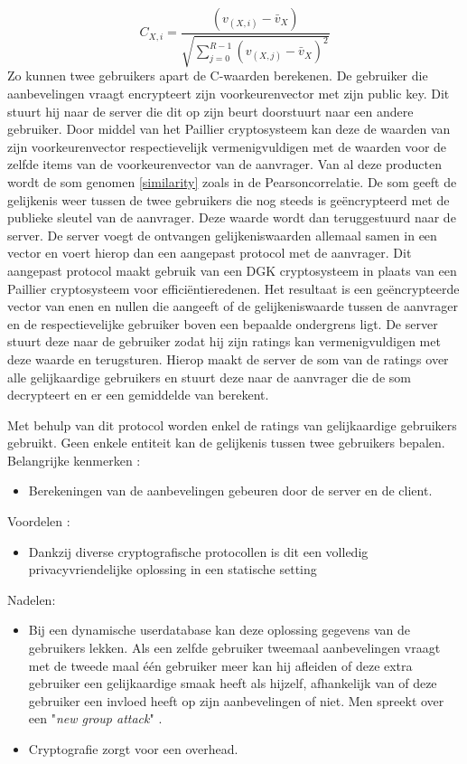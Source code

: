 \begin{equation}\label{c_value}
C_{X,i} = \frac{(v_{(X,i)} - \bar{v}_X)}{\sqrt{\sum_{j=0}^{R-1} (v_{(X,j)} - \bar{v}_X)^2}}\end{equation}
Zo kunnen twee gebruikers apart de C-waarden berekenen. De gebruiker die aanbevelingen vraagt encrypteert zijn voorkeurenvector met zijn public key. Dit stuurt hij naar de server die dit op zijn beurt doorstuurt naar een andere gebruiker. Door middel van het Paillier cryptosysteem kan deze de waarden van zijn voorkeurenvector respectievelijk vermenigvuldigen met de waarden voor de zelfde items van de voorkeurenvector van de aanvrager.  Van al deze producten wordt de som genomen \eqref{similarity} zoals in de Pearsoncorrelatie. De som geeft de gelijkenis weer tussen de twee gebruikers die nog steeds is ge\"encrypteerd met de publieke sleutel van de aanvrager. Deze waarde wordt dan teruggestuurd naar de server. De server voegt de ontvangen gelijkeniswaarden allemaal samen in een vector en voert hierop dan een aangepast protocol met de aanvrager. Dit aangepast protocol maakt gebruik van een DGK cryptosysteem in plaats van een Paillier cryptosysteem voor effici\"entieredenen. Het resultaat is een geëncrypteerde vector van enen en nullen die aangeeft of  de gelijkeniswaarde tussen de aanvrager en de respectievelijke gebruiker boven een bepaalde ondergrens ligt. De server stuurt deze naar de gebruiker zodat hij zijn ratings kan vermenigvuldigen met deze waarde en terugsturen. Hierop maakt de server de som van de ratings over alle gelijkaardige gebruikers en stuurt deze naar de aanvrager die de som decrypteert en er een gemiddelde van berekent.

Met behulp van dit protocol worden enkel de ratings van gelijkaardige gebruikers gebruikt. Geen enkele entiteit kan de gelijkenis tussen twee gebruikers bepalen.\\



Belangrijke kenmerken :
\begin{itemize}

\item Berekeningen van de aanbevelingen gebeuren door de server en de client.
\end{itemize}
Voordelen : 
\begin{itemize}
\item Dankzij diverse cryptografische protocollen is dit een volledig privacyvriendelijke oplossing in een statische setting
\end{itemize}
Nadelen:
\begin{itemize}
\item Bij een dynamische userdatabase kan deze oplossing gegevens van de gebruikers lekken. Als een zelfde gebruiker tweemaal aanbevelingen vraagt met de tweede maal \'e\'en gebruiker meer kan hij afleiden of deze extra gebruiker een gelijkaardige smaak heeft als hijzelf, afhankelijk van of deze gebruiker een invloed heeft op zijn aanbevelingen of niet. Men spreekt over een "\emph{new group attack}" \cite{kononchuk2013privacy}.
\item Cryptografie zorgt voor een overhead.

\end{itemize}
